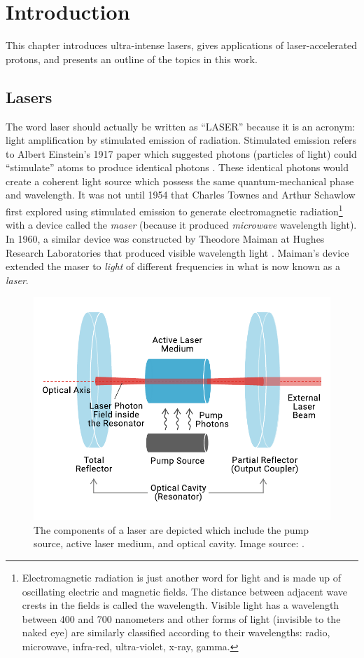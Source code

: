 \chapter{Introduction} \label{ch:1}
This chapter introduces ultra-intense lasers, gives applications of laser-accelerated protons, and presents an outline of the topics in this work.

\section{Lasers} \label{sec:lasers}

The word laser should actually be written as ``LASER'' because it is an acronym: light amplification by stimulated emission of radiation. Stimulated emission refers to Albert Einstein's 1917 paper which suggested photons (particles of light) could ``stimulate'' atoms to produce identical photons \cite{Einstein_1917_Quantum}. These identical photons would create a coherent light source which possess the same quantum-mechanical phase and wavelength. It was not until 1954 that Charles Townes and Arthur Schawlow first explored using stimulated emission to generate electromagnetic radiation\footnote{Electromagnetic radiation is just another word for light and is made up of oscillating electric and magnetic fields. The distance between adjacent wave crests in the fields is called the wavelength. Visible light has a wavelength between 400 and 700 nanometers and other forms of light (invisible to the naked eye) are similarly classified according to their wavelengths: radio, microwave, infra-red, ultra-violet, x-ray, gamma.} with a device called the \emph{maser} (because it produced \emph{microwave} wavelength light). In 1960, a similar device was constructed by Theodore Maiman at Hughes Research Laboratories that produced visible wavelength light \cite{Maiman_1960_Nature}. Maiman's device extended the maser to \emph{light} of different frequencies in what is now known as a \emph{laser}.

\begin{figure}
	\centering
	\includegraphics[width=0.75\linewidth]{planning/images/laser_gain.pdf}
	\caption{The components of a laser are depicted which include the pump source, active laser medium, and optical cavity. Image source: \cite{MeetOpticsPost}.}
	\label{fig:laser_gain}
\end{figure}

